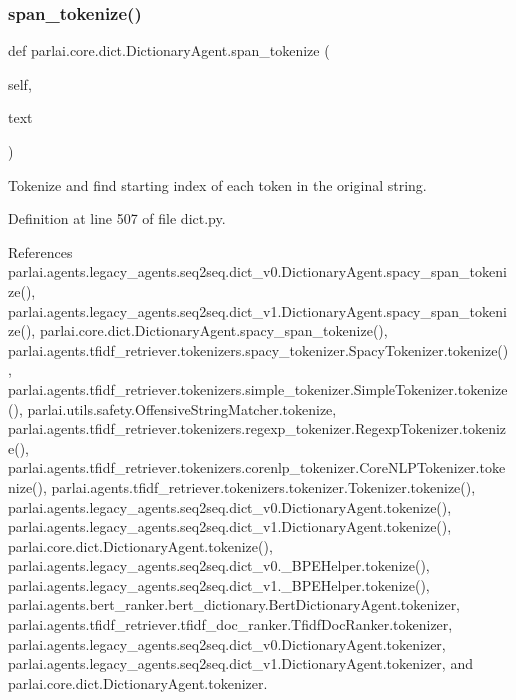 \mbox{\label{classparlai_1_1core_1_1dict_1_1DictionaryAgent_a8fede3cf83af6a47c5dd4bb356de3350}} 
\subsubsection{\texorpdfstring{span\+\_\+tokenize()}{span\_tokenize()}}
{\footnotesize\ttfamily def parlai.\+core.\+dict.\+Dictionary\+Agent.\+span\+\_\+tokenize (\begin{DoxyParamCaption}\item[{}]{self,  }\item[{}]{text }\end{DoxyParamCaption})}

\begin{DoxyVerb}Tokenize and find  starting index of each token in the original string.\end{DoxyVerb}
 

Definition at line 507 of file dict.\+py.



References parlai.\+agents.\+legacy\+\_\+agents.\+seq2seq.\+dict\+\_\+v0.\+Dictionary\+Agent.\+spacy\+\_\+span\+\_\+tokenize(), parlai.\+agents.\+legacy\+\_\+agents.\+seq2seq.\+dict\+\_\+v1.\+Dictionary\+Agent.\+spacy\+\_\+span\+\_\+tokenize(), parlai.\+core.\+dict.\+Dictionary\+Agent.\+spacy\+\_\+span\+\_\+tokenize(), parlai.\+agents.\+tfidf\+\_\+retriever.\+tokenizers.\+spacy\+\_\+tokenizer.\+Spacy\+Tokenizer.\+tokenize(), parlai.\+agents.\+tfidf\+\_\+retriever.\+tokenizers.\+simple\+\_\+tokenizer.\+Simple\+Tokenizer.\+tokenize(), parlai.\+utils.\+safety.\+Offensive\+String\+Matcher.\+tokenize, parlai.\+agents.\+tfidf\+\_\+retriever.\+tokenizers.\+regexp\+\_\+tokenizer.\+Regexp\+Tokenizer.\+tokenize(), parlai.\+agents.\+tfidf\+\_\+retriever.\+tokenizers.\+corenlp\+\_\+tokenizer.\+Core\+N\+L\+P\+Tokenizer.\+tokenize(), parlai.\+agents.\+tfidf\+\_\+retriever.\+tokenizers.\+tokenizer.\+Tokenizer.\+tokenize(), parlai.\+agents.\+legacy\+\_\+agents.\+seq2seq.\+dict\+\_\+v0.\+Dictionary\+Agent.\+tokenize(), parlai.\+agents.\+legacy\+\_\+agents.\+seq2seq.\+dict\+\_\+v1.\+Dictionary\+Agent.\+tokenize(), parlai.\+core.\+dict.\+Dictionary\+Agent.\+tokenize(), parlai.\+agents.\+legacy\+\_\+agents.\+seq2seq.\+dict\+\_\+v0.\+\_\+\+B\+P\+E\+Helper.\+tokenize(), parlai.\+agents.\+legacy\+\_\+agents.\+seq2seq.\+dict\+\_\+v1.\+\_\+\+B\+P\+E\+Helper.\+tokenize(), parlai.\+agents.\+bert\+\_\+ranker.\+bert\+\_\+dictionary.\+Bert\+Dictionary\+Agent.\+tokenizer, parlai.\+agents.\+tfidf\+\_\+retriever.\+tfidf\+\_\+doc\+\_\+ranker.\+Tfidf\+Doc\+Ranker.\+tokenizer, parlai.\+agents.\+legacy\+\_\+agents.\+seq2seq.\+dict\+\_\+v0.\+Dictionary\+Agent.\+tokenizer, parlai.\+agents.\+legacy\+\_\+agents.\+seq2seq.\+dict\+\_\+v1.\+Dictionary\+Agent.\+tokenizer, and parlai.\+core.\+dict.\+Dictionary\+Agent.\+tokenizer.

